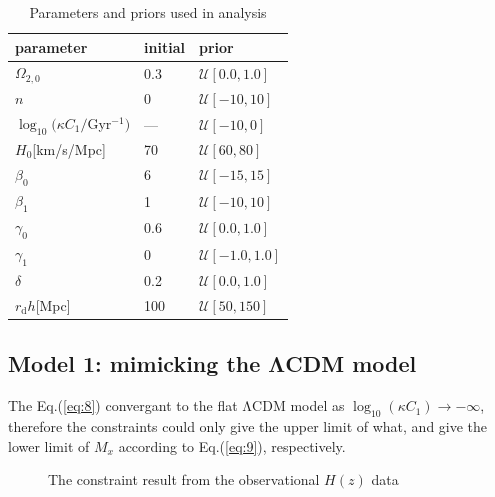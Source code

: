 \documentclass[twocolumn]{aastex631}
\begin{document}
   \begin{table}[htbp]
      \caption{Parameters and priors used in analysis}
      \centering
      \begin{tabular}{lll}
         \hline\hline
         parameter & initial & prior \\
         \hline
         $\Omega_{2,0}$ & 0.3 & $\mathcal{U}[0.0,1.0]$ \\
         $n$ & 0 & $\mathcal{U}[-10,10]$ \\
         $\log_{10}(\kappa C_1/$Gyr${}^{-1})$ & --- & $\mathcal{U}[-10,0]$ \\
         $H_0$[km/s/Mpc] & 70 & $\mathcal{U}[60,80]$ \\
         \hline
         $\beta_0$ & 6 & $\mathcal{U}[-15,15]$ \\
         $\beta_1$ & 1 & $\mathcal{U}[-10,10]$ \\
         $\gamma_0$ & 0.6 & $\mathcal{U}[0.0,1.0]$ \\
         $\gamma_1$ & 0 & $\mathcal{U}[-1.0,1.0]$ \\         
         $\delta$ & 0.2 & $\mathcal{U}[0.0,1.0]$ \\
         \hline
         $r_{\text{d}}h$[Mpc] & 100 & $\mathcal{U}[50,150]$ \\
         \hline
      \end{tabular}
      \label{tab:4}
   \end{table}

\subsection{Model 1: mimicking the ΛCDM model}

   The Eq.(\ref{eq:8}) convergant to the flat ΛCDM model as
   $\log_{10}(\kappa C_1)\to-\infty$, therefore the constraints
   could only give the upper limit of what, and give the lower limit
   of $M_x$ according to Eq.(\ref{eq:9}), respectively.

   \begin{figure}[htbp]
      \centering
      \caption{The constraint result from the observational
      $H(z)$ data}
   \end{figure}
\end{document}
